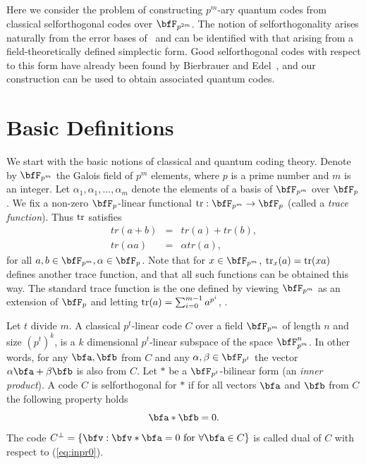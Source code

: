 \documentclass{article}
\def\tr{\qopname\relax{no}{tr}}
\begin{document}
Here we consider the problem of constructing $p^m$-ary quantum codes
from classical selforthogonal codes over $\bfF_{p^{2m}}$. The notion
of selforthogonality arises naturally from the error bases
of~\cite{Knill96_1,Knill96_2} and can be identified with that arising
from a field-theoretically defined simplectic form. Good
selforthogonal codes with respect to this form have already been found
by Bierbrauer and Edel~\cite{Bierbrauer98}, and our construction can
be used to obtain associated quantum codes.

\section{Basic Definitions}

We start with the basic notions of classical and quantum coding
theory. Denote by $\bfF_{p^m}$ the Galois field of $p^m$ elements,
where $p$ is a prime number and $m$ is an integer. Let $\alpha_1,
\alpha_1, \ldots , \alpha_m$ denote the elements of a basis of
$\bfF_{p^m}$ over $\bfF_{p}$.  We fix
a non-zero $\bfF_{p}$-linear functional
$\tr: \bfF_{p^m}\rightarrow \bfF_{p}$
(called a \emph{trace function}). Thus $\tr$ satisfies
\begin{eqnarray*}
tr(a+b)&=&tr(a)+tr(b),\\
tr(\alpha a)&=&\alpha tr(a),
\end{eqnarray*}
for all $a,b\in \bfF_{p^m}, \alpha \in \bfF_p$.
Note that for $x\in\bfF_{p^m}$, $\tr_x(a) = \tr(xa)$
defines another trace function, and that all such functions
can be obtained this way. The standard trace function
is the one defined by viewing $\bfF_{p^m}$ as an extension
of $\bfF_p$ and letting $\tr(a)=\sum_{i=0}^{m-1}a^{p^i}$,
\cite[Chapter 2.3]{macw77}.

Let $t$ divide $m$.  A classical $p^t$-linear code $C$ over a field
$\bfF_{p^m}$ of length $n$ and size $(p^t)^k$, is a $k$ dimensional
$p^t$-linear subspace of the space $\bfF_{p^m}^n$. In other words, for
any $\bfa,\bfb$ from $C$ and any $\alpha,\beta\in \bfF_{p^t}$ the
vector $\alpha \bfa+\beta \bfb$ is also from $C$.  Let $*$ be a
$\bfF_{p^t}$-bilinear form (an \emph{inner product}).  A code $C$ is
selforthogonal for $*$ if for all vectors $\bfa$ and $\bfb$ from $C$
the following property holds
\begin{equation}\label{eq:inpr0}
\bfa * \bfb=0.
\end{equation}
The code $C^\perp=\{\bfv: \bfv*\bfa=0 \mbox{ for } \forall \bfa\in C\}$ is
called dual of $C$ with respect to (\ref{eq:inpr0}).
\end{document}
